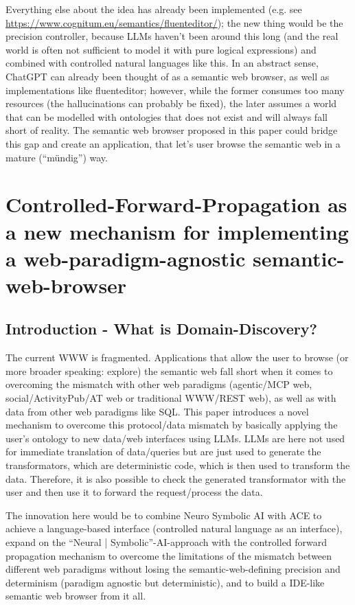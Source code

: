 \documentclass[12pt,a4paper]{article}
\begin{document}
Everything else about the idea has already been implemented (e.g. see \url{https://www.cognitum.eu/semantics/fluenteditor/}); the new thing would be the precision controller, because LLMs haven't been around this long (and the real world is often not sufficient to model it with pure logical expressions) and combined with controlled natural languages like this. In an abstract sense, ChatGPT can already been thought of as a semantic web browser, as well as implementations like fluenteditor; however, while the former consumes too many resources (the hallucinations can probably be fixed), the later assumes a world that can be modelled with ontologies that does not exist and will always fall short of reality. The semantic web browser proposed in this paper could bridge this gap and create an application, that let's user browse the semantic web in a mature (``mündig'') way.

\newpage

\section{Controlled-Forward-Propagation as a new mechanism for implementing a web-paradigm-agnostic semantic-web-browser}

\subsection{Introduction - What is Domain-Discovery?}

The current WWW is fragmented. Applications that allow the user to browse (or more broader speaking: explore) the semantic web fall short when it comes to overcoming the mismatch with other web paradigms (agentic/MCP web, social/ActivityPub/AT web or traditional WWW/REST web), as well as with data from other web paradigms like SQL. This paper introduces a novel mechanism to overcome this protocol/data mismatch by basically applying the user's ontology to new data/web interfaces using LLMs. LLMs are here not used for immediate translation of data/queries but are just used to generate the transformators, which are deterministic code, which is then used to transform the data. Therefore, it is also possible to check the generated transformator with the user and then use it to forward the request/process the data.

The innovation here would be to combine Neuro Symbolic AI with ACE to achieve a language-based interface (controlled natural language as an interface), expand on the ``Neural | Symbolic''-AI-approach with the controlled forward propagation mechanism to overcome the limitations of the mismatch between different web paradigms without losing the semantic-web-defining precision and determinism (paradigm agnostic but deterministic), and to build a IDE-like semantic web browser from it all.
\end{document}
